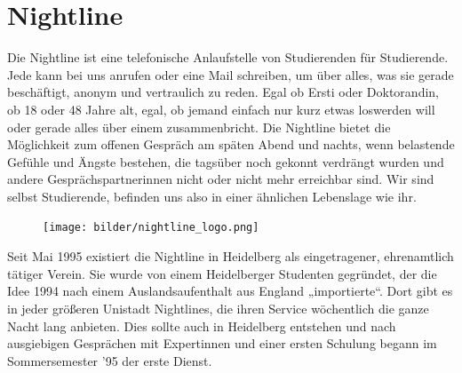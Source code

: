 \section{Nightline}%
Die Nightline ist eine telefonische Anlaufstelle von Studierenden für Studierende. Jede kann bei uns anrufen oder eine Mail schreiben, um über alles, was sie gerade beschäftigt, anonym und vertraulich zu reden. Egal ob Ersti oder Doktorandin, ob 18 oder 48 Jahre alt, egal, ob jemand einfach nur kurz etwas loswerden will oder gerade alles über einem zusammenbricht. Die Nightline bietet die Möglichkeit zum offenen Gespräch am späten Abend und nachts, wenn belastende Gefühle und Ängste bestehen, die tagsüber noch gekonnt verdrängt wurden und andere Gesprächspartnerinnen nicht oder nicht mehr erreichbar sind. Wir sind selbst Studierende, befinden uns also in einer ähnlichen Lebenslage wie ihr.

\begin{figure}[b]
    \centering
    \texttt{[image: bilder/nightline\_logo.png]}
\end{figure}


\begin{figure}[!b]
\end{figure}

Seit Mai 1995 existiert die Nightline in Heidelberg als eingetragener, ehrenamtlich tätiger Verein. Sie wurde von einem Heidelberger Studenten gegründet, der die Idee 1994 nach einem Auslandsaufenthalt aus England „importierte“. Dort gibt es in jeder größeren Unistadt Nightlines, die ihren Service wöchentlich die ganze Nacht lang anbieten. Dies sollte auch in Heidelberg entstehen und nach ausgiebigen Gesprächen mit Expertinnen und einer ersten Schulung begann im Sommersemester '95 der erste Dienst.

